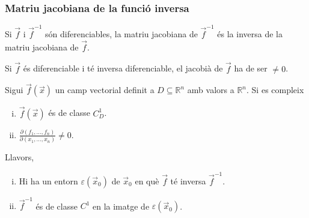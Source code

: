 \subsubsection*{Matriu jacobiana de la funció inversa}
\begin{thm}
    Si $\vec{f}$ i $\vec{f}^{-1}$ són diferenciables, la matriu jacobiana de $\vec{f}^{-1}$ és la inversa de la matriu jacobiana de $\vec{f}$.
\end{thm}
\begin{cor}
    Si $\vec{f}$ és diferenciable i té inversa diferenciable, el jacobià de $\vec{f}$ ha de ser $\neq 0$.
\end{cor}
\begin{thm}
    Sigui $\vec{f}(\vec{x})$ un camp vectorial definit a $D \subseteq \mathbb{R}^{n}$ amb valors a $\mathbb{R}^{n}$. Si es compleix
    \begin{enumerate}[i)]
        \item $\vec{f}(\vec{x})$ és de classe $C^{1}_{D}$.
        \item $\displaystyle \frac{\partial (f_{1}, \dots, f_{n})}{\partial (x_{1}, \dots, x_{n})} \neq 0$.
    \end{enumerate}
    Llavors, 
    \begin{enumerate}[i)]
        \item Hi ha un entorn $\varepsilon (\vec{x}_{0})$ de $\vec{x}_{0}$ en què $\vec{f}$ té inversa $\vec{f}^{-1}$.
        \item $\vec{f}^{-1}$ és de classe $C^{1}$ en la imatge de $\varepsilon (\vec{x}_{0})$.
    \end{enumerate}
\end{thm}

